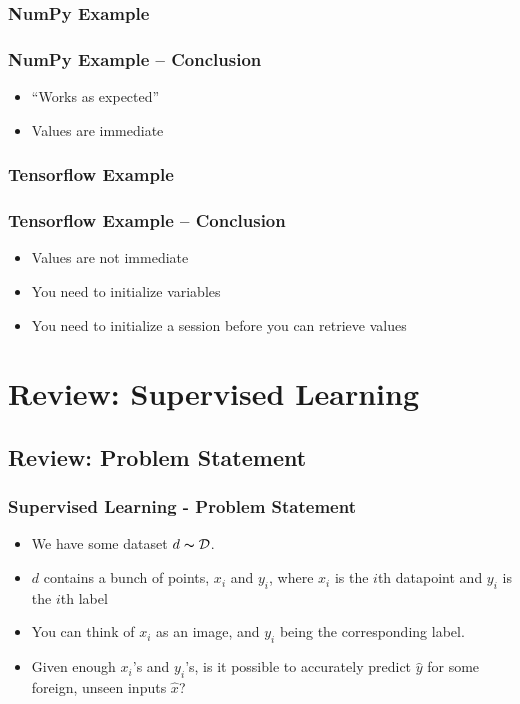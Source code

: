 \documentclass{beamer}
\begin{document}
\begin{frame}
  \frametitle{NumPy Example}
\end{frame}

\begin{frame}
  \frametitle{NumPy Example -- Conclusion}
  \begin{itemize}
  \item ``Works as expected''
  \item Values are immediate
  \end{itemize}
\end{frame}

\begin{frame}
  \frametitle{Tensorflow Example}
\end{frame}

\begin{frame}
  \frametitle{Tensorflow Example -- Conclusion}
  \begin{itemize}
  \item Values are not immediate
  \item You need to initialize variables
  \item You need to initialize a session before you can retrieve values
  \end{itemize}
\end{frame}

\section{Review: Supervised Learning} %

\subsection{Review: Problem Statement}
\begin{frame}
  \frametitle{Supervised Learning - Problem Statement}
  \begin{itemize}
  \item We have some dataset $d \thicksim \mathcal{D}$.
  \item $d$ contains a bunch of points, $x_i$ and $y_i$, where $x_i$ is the $i$th datapoint and $y_i$ is the $i$th label
  \item You can think of $x_i$ as an image, and $y_i$ being the corresponding label.
  \item Given enough $x_i$'s and $y_i$'s, is it possible to accurately predict $\hat{y}$ for some foreign, unseen inputs $\hat{x}$?
  \end{itemize}
\end{frame}
\end{document}
